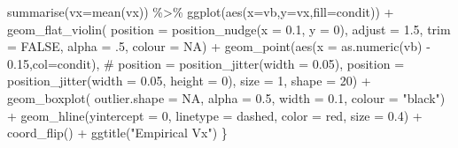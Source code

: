 \documentclass[
  letterpaper,
  DIV=11,
  numbers=noendperiod]{scrartcl}
\newenvironment{Shaded}{\begin{snugshade}}{\end{snugshade}}
\newcommand{\AttributeTok}[1]{\textcolor[rgb]{0.40,0.45,0.13}{#1}}
\newcommand{\CommentTok}[1]{\textcolor[rgb]{0.37,0.37,0.37}{#1}}
\newcommand{\ConstantTok}[1]{\textcolor[rgb]{0.56,0.35,0.01}{#1}}
\newcommand{\DecValTok}[1]{\textcolor[rgb]{0.68,0.00,0.00}{#1}}
\newcommand{\FloatTok}[1]{\textcolor[rgb]{0.68,0.00,0.00}{#1}}
\newcommand{\FunctionTok}[1]{\textcolor[rgb]{0.28,0.35,0.67}{#1}}
\newcommand{\NormalTok}[1]{\textcolor[rgb]{0.00,0.23,0.31}{#1}}
\newcommand{\SpecialCharTok}[1]{\textcolor[rgb]{0.37,0.37,0.37}{#1}}
\newcommand{\StringTok}[1]{\textcolor[rgb]{0.13,0.47,0.30}{#1}}
\begin{document}
\begin{Shaded}
\begin{Highlighting}[]
  \FunctionTok{summarise}\NormalTok{(}\AttributeTok{vx=}\FunctionTok{mean}\NormalTok{(vx)) }\SpecialCharTok{\%\textgreater{}\%}
  \FunctionTok{ggplot}\NormalTok{(}\FunctionTok{aes}\NormalTok{(}\AttributeTok{x=}\NormalTok{vb,}\AttributeTok{y=}\NormalTok{vx,}\AttributeTok{fill=}\NormalTok{condit)) }\SpecialCharTok{+} 
  \FunctionTok{geom\_flat\_violin}\NormalTok{( }\AttributeTok{position =} \FunctionTok{position\_nudge}\NormalTok{(}\AttributeTok{x =} \FloatTok{0.1}\NormalTok{, }\AttributeTok{y =} \DecValTok{0}\NormalTok{),}
                   \AttributeTok{adjust =} \FloatTok{1.5}\NormalTok{,}
                   \AttributeTok{trim =} \ConstantTok{FALSE}\NormalTok{,}
                   \AttributeTok{alpha =}\NormalTok{ .}\DecValTok{5}\NormalTok{,}
                   \AttributeTok{colour =} \ConstantTok{NA}\NormalTok{) }\SpecialCharTok{+}
  \FunctionTok{geom\_point}\NormalTok{(}\FunctionTok{aes}\NormalTok{(}\AttributeTok{x =} \FunctionTok{as.numeric}\NormalTok{(vb) }\SpecialCharTok{{-}} \FloatTok{0.15}\NormalTok{,}\AttributeTok{col=}\NormalTok{condit),}
             \CommentTok{\# position = position\_jitter(width = 0.05),}
             \AttributeTok{position =} \FunctionTok{position\_jitter}\NormalTok{(}\AttributeTok{width =} \FloatTok{0.05}\NormalTok{, }\AttributeTok{height =} \DecValTok{0}\NormalTok{),}
             \AttributeTok{size =} \DecValTok{1}\NormalTok{,}
             \AttributeTok{shape =} \DecValTok{20}\NormalTok{) }\SpecialCharTok{+}
  \FunctionTok{geom\_boxplot}\NormalTok{(}
               \AttributeTok{outlier.shape =} \ConstantTok{NA}\NormalTok{,}
               \AttributeTok{alpha =} \FloatTok{0.5}\NormalTok{,}
               \AttributeTok{width =} \FloatTok{0.1}\NormalTok{,}
               \AttributeTok{colour =} \StringTok{"black"}\NormalTok{) }\SpecialCharTok{+}
  \FunctionTok{geom\_hline}\NormalTok{(}\AttributeTok{yintercept =} \DecValTok{0}\NormalTok{,}
             \AttributeTok{linetype =} \StringTok{\textquotesingle{}dashed\textquotesingle{}}\NormalTok{,}
             \AttributeTok{color =} \StringTok{\textquotesingle{}red\textquotesingle{}}\NormalTok{,}
             \AttributeTok{size =} \FloatTok{0.4}\NormalTok{) }\SpecialCharTok{+} 
  \FunctionTok{coord\_flip}\NormalTok{() }\SpecialCharTok{+} \FunctionTok{ggtitle}\NormalTok{(}\StringTok{"Empirical Vx"}\NormalTok{) }
\NormalTok{\}}
\end{Highlighting}
\end{Shaded}
\end{document}
